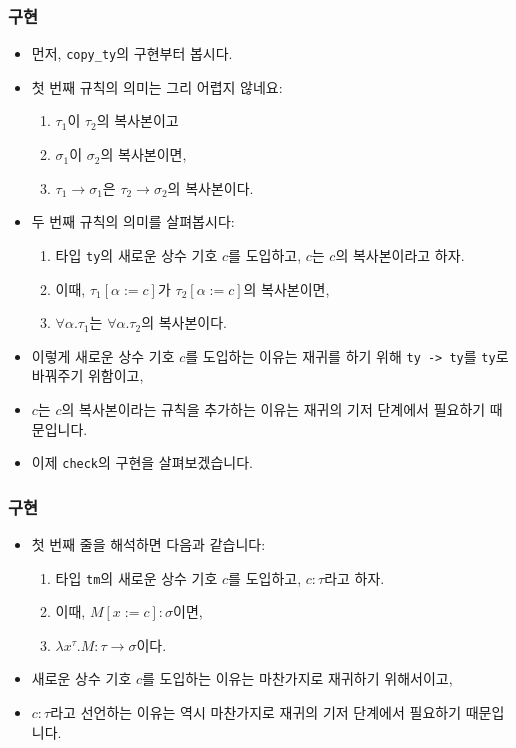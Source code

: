 \documentclass[slidestop,compress,mathserif]{beamer}
\begin{document}
    \begin{frame}
        \frametitle{구현}
        \begin{itemize}
            \item 먼저, \texttt{copy\_ty}의 구현부터 봅시다.
            \pause
            \item 첫 번째 규칙의 의미는 그리 어렵지 않네요:
            \begin{enumerate}
                \item $\tau_1$이 $\tau_2$의 복사본이고
                \item $\sigma_1$이 $\sigma_2$의 복사본이면,
                \item $\tau_1 \to \sigma_1$은 $\tau_2 \to \sigma_2$의 복사본이다.
            \end{enumerate}
            \pause
            \item 두 번째 규칙의 의미를 살펴봅시다:
            \begin{enumerate}
                \item 타입 \texttt{ty}의 새로운 상수 기호 $c$를 도입하고, $c$는 $c$의 복사본이라고 하자.
                \item 이때, $\tau_1 \left[ \alpha := c \right]$가 $\tau_2 \left[ \alpha := c \right]$의 복사본이면,
                \item $\forall \alpha . \tau_1$는 $\forall \alpha . \tau_2$의 복사본이다.
            \end{enumerate}
            \item 이렇게 새로운 상수 기호 $c$를 도입하는 이유는 재귀를 하기 위해 \texttt{ty -> ty}를 \texttt{ty}로 바꿔주기 위함이고,
            \item $c$는 $c$의 복사본이라는 규칙을 추가하는 이유는 재귀의 기저 단계에서 필요하기 때문입니다.
            \pause
            \item 이제 \texttt{check}의 구현을 살펴보겠습니다.
        \end{itemize}
    \end{frame}

    \begin{frame}
        \frametitle{구현}
        \begin{itemize}
            \item 첫 번째 줄을 해석하면 다음과 같습니다:
            \begin{enumerate}
                \item 타입 \texttt{tm}의 새로운 상수 기호 $c$를 도입하고, $c : \tau$라고 하자.
                \item 이때, $M \left[ x := c \right] : \sigma$이면,
                \item $\lambda x^{\tau} . M : \tau \to \sigma$이다.
            \end{enumerate}
            \item 새로운 상수 기호 $c$를 도입하는 이유는 마찬가지로 재귀하기 위해서이고,
            \item $c : \tau$라고 선언하는 이유는 역시 마찬가지로 재귀의 기저 단계에서 필요하기 때문입니다.
        \end{itemize}
    \end{frame}
\end{document}
